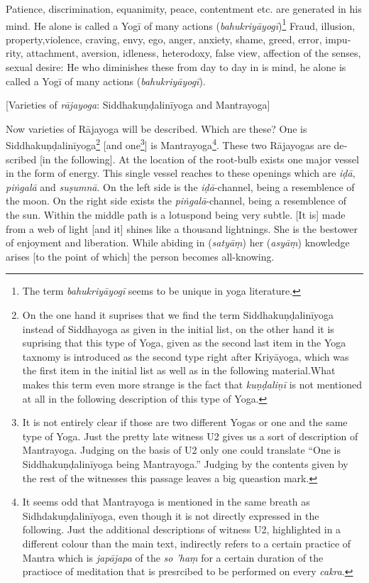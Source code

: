 \begin{otherlanguage}{english}
\begin{tlate}
Patience, discrimination, equanimity, peace, contentment etc. are generated in his mind. He alone is called a Yogī of many actions (\textit{bahukriyāyogī})\footnote{The term \textit{bahukriyāyogī} seems to be unique in yoga literature.} Fraud, illusion, property,violence, craving, envy, ego, anger, anxiety, shame, greed, error, impurity, attachment, aversion, idleness, heterodoxy, false view, affection of the senses, sexual desire: He who diminishes these from day to day in is mind, he alone is called a Yogī of many actions (\textit{bahukriyāyogī}).
   \end{tlate}
        \bigskip
    \centerline{\textrm{\small{[Varieties of \textit{rājayoga}: Siddhakuṇḍalinīyoga and Mantrayoga]}}}
    \bigskip
    \begin{tlate}
      Now varieties of Rājayoga will be described. Which are these? One is Siddhakuṇḍalinīyoga\footnote{On the one hand it suprises that we find the term Siddhakuṇḍalinīyoga instead of Siddhayoga as given in the initial list, on the other hand it is suprising that this type of Yoga, given as the second last item in the Yoga taxnomy is introduced as the second type right after Kriyāyoga, which was the first item in the initial list as well as in the following material.What makes this term even more strange is the fact that \textit{kuṇḍaliṇī} is not mentioned at all in the following description of this type of Yoga.} [and one\footnote{It is not entirely clear if those are two different Yogas or one and the same type of Yoga. Just the pretty late witness U2 gives us a sort of description of Mantrayoga. Judging on the basis of U2 only one could translate ``One is Siddhakuṇḍalinīyoga being Mantrayoga.'' Judging by the contents given by the rest of the witnesses this passage leaves a big queastion mark.}] is Mantrayoga\footnote{It seems odd that Mantrayoga is mentioned in the same breath as Sidhdakuṇḍalinīyoga, even though it is not directly expressed in the following. Just the additional descriptions of witness U2, highlighted in a different colour than the main text, indirectly refers to a certain practice of Mantra which is \textit{japājapa} of the \textit{so 'haṃ} for a certain duration of the practioce of meditation that is presrcibed to be performed on every \textit{cakra}.}. These two Rājayogas are described [in the following]. At the location of the root-bulb exists one major vessel in the form of energy. This single vessel reaches to these openings which are \textit{iḍā}, \textit{piṅgalā} and \textit{suṣumnā}. On the left side is the \textit{iḍā}-channel, being a resemblence of the moon. On the right side exists the \textit{piṅgalā}-channel, being a resemblence of the sun. Within the middle path is a lotuspond being very subtle. [It is] made from a web of light [and it] shines like a thousand lightnings. She  is the bestower of enjoyment and liberation. While abiding in (\textit{satyāṃ}) her (\textit{asyāṃ}) knowledge arises [to the point of which] the person becomes all-knowing.

\end{tlate}
\end{otherlanguage}
